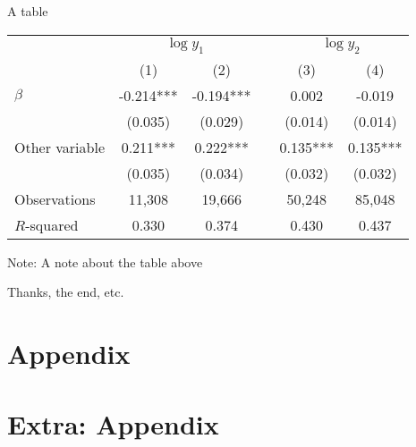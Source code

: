 \documentclass[aspectratio=169, 11pt]{beamer}
\begin{document}
\begin{frame}{A table}
    \footnotesize
    \setlength{\tabcolsep}{0.5em}
    \begin{center}
    \begin{tabular}{lSScSS}
    &  && 
       \\
            & {(1)}     & {(2)}     && {(3)}     & {(4)}     \\ \midrule
    $\beta$
            & -0.214*** & -0.194*** &&  0.002    & -0.019    \\
            & (0.035)   & (0.029)   && (0.014)   & (0.014)   \\
    Other variable
            &  0.211*** &  0.222*** &&  0.135*** &  0.135*** \\
            & (0.035)   & (0.034)   && (0.032)   & (0.032)   \\ \midrule
    Observations 
            &  {11,308} & {19,666}  && {50,248}  & {85,048}  \\
    $R$-squared
            & {0.330}   & {0.374}   && {0.430}   & {0.437}   \\
    \end{tabular}%
    \end{center}
    
    Note: A note about the table above
\end{frame}

\begin{frame}
    \begin{center}
        \LARGE Thanks, the end, etc.
    \end{center}
\end{frame}

\AtBeginSection[]{}
\section{Appendix}

\appendix

\section{Extra: Appendix}
\end{document}
